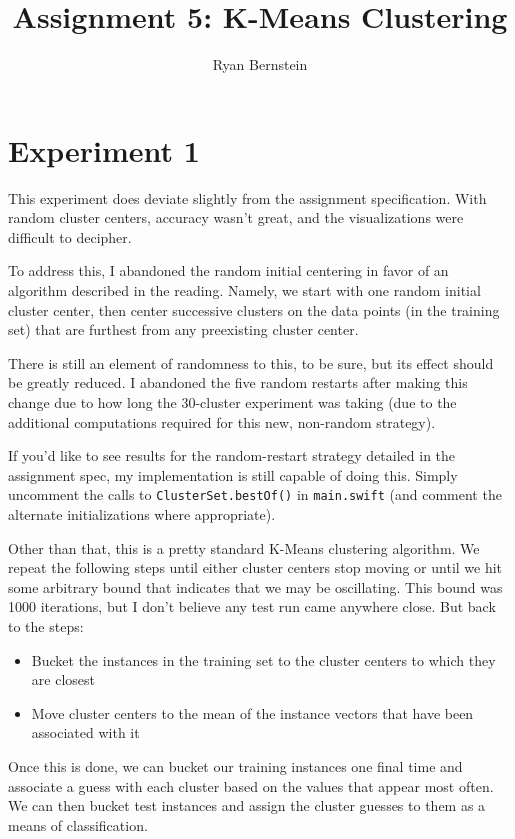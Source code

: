\documentclass[11pt, oneside]{article}    %
\title{Assignment 5: K-Means Clustering}
\author{Ryan Bernstein}
\begin{document}
\maketitle

\section{Experiment 1}

This experiment does deviate slightly from the assignment specification. With random cluster centers, accuracy wasn't great, and the visualizations were difficult to decipher.

To address this, I abandoned the random initial centering in favor of an algorithm described in the reading. Namely, we start with one random initial cluster center, then center successive clusters on the data points (in the training set) that are furthest from any preexisting cluster center.

There is still an element of randomness to this, to be sure, but its effect should be greatly reduced. I abandoned the five random restarts after making this change due to how long the 30-cluster experiment was taking (due to the additional computations required for this new, non-random strategy).

If you'd like to see results for the random-restart strategy detailed in the assignment spec, my implementation is still capable of doing this. Simply uncomment the calls to \texttt{ClusterSet.bestOf()} in \texttt{main.swift} (and comment the alternate initializations where appropriate).

Other than that, this is a pretty standard K-Means clustering algorithm. We repeat the following steps until either cluster centers stop moving or until we hit some arbitrary bound that indicates that we may be oscillating. This bound was 1000 iterations, but I don't believe any test run came anywhere close. But back to the steps:
\begin{itemize}
	\item Bucket the instances in the training set to the cluster centers to which they are closest
	\item Move cluster centers to the mean of the instance vectors that have been associated with it
\end{itemize}

Once this is done, we can bucket our training instances one final time and associate a guess with each cluster based on the values that appear most often. We can then bucket test instances and assign the cluster guesses to them as a means of classification.
\end{document}
